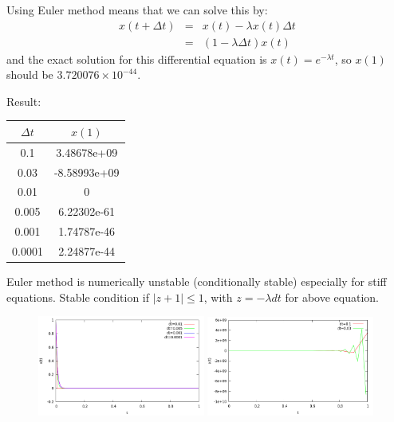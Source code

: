 \documentclass[paper=a4, fontsize=11pt]{scrartcl}
\numberwithin{equation}{section} %
\numberwithin{figure}{section} %
\numberwithin{table}{section} %
\begin{document}
Using Euler method means that we can solve this by:
\begin{eqnarray*}
x(t+\Delta t) &=& x(t) - \lambda x(t) \Delta t\\
&=& (1 - \lambda \Delta t) x(t)
\end{eqnarray*}
and the exact solution for this differential equation is $x(t) = e^{-\lambda t}$, so $x(1)$ should be $3.720076 \times 10^{-44}$.

Result:
\begin{table}[ht]
\begin{tabular}{c c}
\hline
$\Delta t$ & $x(1)$ \\ [0.5ex]
\hline 
0.1 & 3.48678e+09 \\
0.03 & -8.58993e+09 \\
0.01 & 0 \\
0.005 & 6.22302e-61 \\
0.001 & 1.74787e-46 \\
0.0001 & 2.24877e-44 \\ [1ex]
\hline 
\end{tabular}
\end{table}

Euler method is numerically unstable (conditionally stable) especially for stiff equations. Stable condition if $\vert z + 1 \vert \leq 1$, with $z = -\lambda dt$ for above equation. 
\begin{figure}
	\centering
	\includegraphics[width=0.49\textwidth]{euler1.png}
	\includegraphics[width=0.49\textwidth]{euler2.png}
\end{figure}
\end{document}
